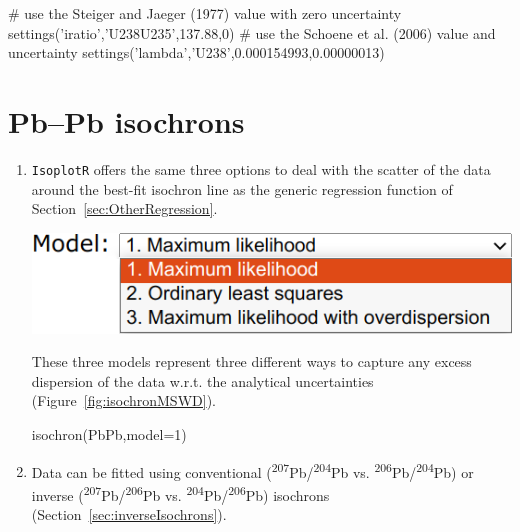 \begin{refsection}
\begin{script}
# use the Steiger and Jaeger (1977) value with zero uncertainty
settings('iratio','U238U235',137.88,0)
# use the Schoene et al. (2006) value and uncertainty
settings('lambda','U238',0.000154993,0.00000013) 
\end{script}

\section{Pb--Pb isochrons}\label{sec:PbPb-isochrons-R}

\begin{enumerate}

\item \texttt{IsoplotR} offers the same three options to deal with the
  scatter of the data around the best-fit isochron line as the generic
  regression function of Section~\ref{sec:OtherRegression}.

\noindent\begin{minipage}[t]{.45\linewidth}
\strut\vspace*{-\baselineskip}\newline
\includegraphics[width=\linewidth]{../figures/PbPbIsochronModels.png}
\end{minipage}
\begin{minipage}[t]{.55\linewidth}
  These three models represent three different ways to capture any
  excess dispersion of the data w.r.t. the analytical uncertainties
  (Figure~\ref{fig:isochronMSWD}).
\end{minipage}

\begin{console}
isochron(PbPb,model=1)
\end{console}

\item Data can be fitted using conventional
  (\textsuperscript{207}Pb/\textsuperscript{204}Pb
  vs. \textsuperscript{206}Pb/\textsuperscript{204}Pb) or inverse
  (\textsuperscript{207}Pb/\textsuperscript{206}Pb
  vs. \textsuperscript{204}Pb/\textsuperscript{206}Pb) isochrons
  (Section~\ref{sec:inverseIsochrons}).


\end{enumerate}
\end{refsection}
